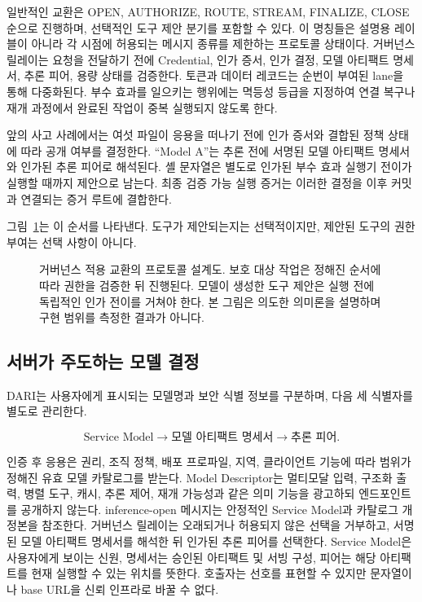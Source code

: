 \documentclass[10pt]{article}
\renewcommand{\textsc}[1]{\textsf{\MakeUppercase{#1}}}
\begin{document}
일반적인 교환은 \textsc{open}, \textsc{authorize}, \textsc{route}, \textsc{stream}, \textsc{finalize}, \textsc{close} 순으로 진행하며, 선택적인 도구 제안 분기를 포함할 수 있다. 이 명칭들은 설명용 레이블이 아니라 각 시점에 허용되는 메시지 종류를 제한하는 프로토콜 상태이다. 거버넌스 릴레이는 요청을 전달하기 전에 Credential, 인가 증서, 인가 결정, 모델 아티팩트 명세서, 추론 피어, 용량 상태를 검증한다. 토큰과 데이터 레코드는 순번이 부여된 lane을 통해 다중화된다. 부수 효과를 일으키는 행위에는 멱등성 등급을 지정하여 연결 복구나 재개 과정에서 완료된 작업이 중복 실행되지 않도록 한다.

앞의 사고 사례에서는 여섯 파일이 응용을 떠나기 전에 인가 증서와 결합된 정책 상태에 따라 공개 여부를 결정한다. ``Model A''는 추론 전에 서명된 모델 아티팩트 명세서와 인가된 추론 피어로 해석된다. 셸 문자열은 별도로 인가된 부수 효과 실행기 전이가 실행할 때까지 제안으로 남는다. 최종 검증 가능 실행 증거는 이러한 결정을 이후 커밋과 연결되는 증거 루트에 결합한다.

그림~\ref{fig:lifecycle}는 이 순서를 나타낸다. 도구가 제안되는지는 선택적이지만, 제안된 도구의 권한 부여는 선택 사항이 아니다.

\begin{figure}[H]
  \centering
  
  \caption{거버넌스 적용 교환의 프로토콜 설계도. 보호 대상 작업은 정해진 순서에 따라 권한을 검증한 뒤 진행된다. 모델이 생성한 도구 제안은 실행 전에 독립적인 인가 전이를 거쳐야 한다. 본 그림은 의도한 의미론을 설명하며 구현 범위를 측정한 결과가 아니다.}
  \label{fig:lifecycle}
\end{figure}

\subsection{서버가 주도하는 모델 결정}

DARI는 사용자에게 표시되는 모델명과 보안 식별 정보를 구분하며, 다음 세 식별자를 별도로 관리한다.

\begin{equation*}
\text{Service Model} \rightarrow \text{모델 아티팩트 명세서} \rightarrow \text{추론 피어}.
\end{equation*}

인증 후 응용은 권리, 조직 정책, 배포 프로파일, 지역, 클라이언트 기능에 따라 범위가 정해진 유효 모델 카탈로그를 받는다. Model Descriptor는 멀티모달 입력, 구조화 출력, 병렬 도구, 캐시, 추론 제어, 재개 가능성과 같은 의미 기능을 광고하되 엔드포인트를 공개하지 않는다. inference-open 메시지는 안정적인 Service Model과 카탈로그 개정본을 참조한다. 거버넌스 릴레이는 오래되거나 허용되지 않은 선택을 거부하고, 서명된 모델 아티팩트 명세서를 해석한 뒤 인가된 추론 피어를 선택한다. Service Model은 사용자에게 보이는 신원, 명세서는 승인된 아티팩트 및 서빙 구성, 피어는 해당 아티팩트를 현재 실행할 수 있는 위치를 뜻한다. 호출자는 선호를 표현할 수 있지만 문자열이나 base URL을 신뢰 인프라로 바꿀 수 없다.
\end{document}

